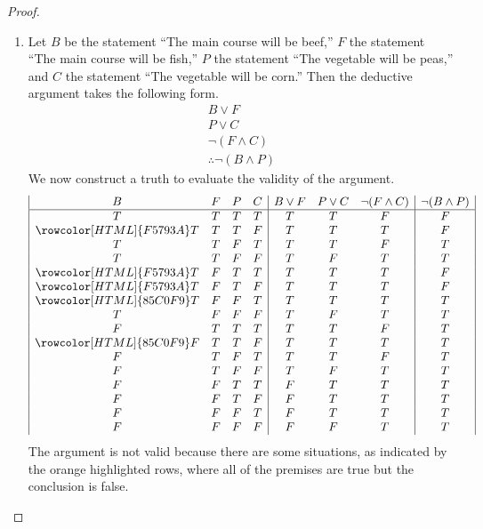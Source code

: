 \documentclass[12pt]{amsart}
\theoremstyle{definition}
\theoremstyle{remark}
\begin{document}
\begin{proof}
\begin{enumerate}
	\item Let $B$ be the statement ``The main course will be beef,'' $F$ the statement ``The main course will be fish,'' $P$ the statement ``The vegetable will be peas,'' and $C$ the statement ``The vegetable will be corn.''
	Then the deductive argument takes the following form.
	\begin{equation*}
		\begin{array}{l}
			B \vee F \\
			P \vee C \\
			\neg (F \wedge C) \\
			\hline
			\therefore \neg (B \wedge P)
		\end{array}
	\end{equation*}
	We now construct a truth to evaluate the validity of the argument.
	\begin{equation*}
		\begin{array}{| c c c c | c c c | c |}
			B & F & P & C & B \vee F & P \vee C & \neg (F \wedge C) & \neg (B \wedge P) \\
			\hline
			T & T & T & T & T & T & F & F \\
			\rowcolor[HTML]{F5793A} T & T & T & F & T & T & T & F \\
			T & T & F & T & T & T & F & T \\
			T & T & F & F & T & F & T & T \\
			\rowcolor[HTML]{F5793A} T & F & T & T & T & T & T & F \\
			\rowcolor[HTML]{F5793A} T & F & T & F & T & T & T & F \\
			\rowcolor[HTML]{85C0F9} T & F & F & T & T & T & T & T \\
			T & F & F & F & T & F & T & T \\
			F & T & T & T & T & T & F & T \\
			\rowcolor[HTML]{85C0F9} F & T & T & F & T & T & T & T \\
			F & T & F & T & T & T & F & T \\
			F & T & F & F & T & F & T & T \\
			F & F & T & T & F & T & T & T \\
			F & F & T & F & F & T & T & T \\
			F & F & F & T & F & T & T & T \\
			F & F & F & F & F & F & T & T
		\end{array}
	\end{equation*}
	The argument is not valid because there are some situations, as indicated by the orange highlighted rows, where all of the premises are true but the conclusion is false.
	

\end{enumerate}
\end{proof}
\end{document}
